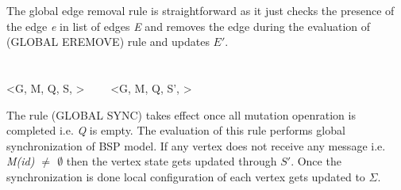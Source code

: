 \smallskip
The global edge removal rule is straightforward as it just checks the presence of the edge \emph{e} in list of edges \emph{E} and removes the edge during the evaluation of (GLOBAL EREMOVE) rule and updates \emph{$E'$}.\\
\ \\
\ \\
{<G, M, Q, S, \bullet > \ \ \reducesto \ \ <G, M, Q, S', \Sigma>}

\smallskip
The rule (GLOBAL SYNC) takes effect once all mutation openration is completed i.e. \emph{Q} is empty. The evaluation of this rule performs global synchronization of BSP model. If any vertex does not receive any message i.e. \emph{M(id) $\neq$ $\emptyset$} then the vertex state gets updated through \emph{$S'$}. Once the synchronization is done local configuration of each vertex gets updated to $\Sigma$.


